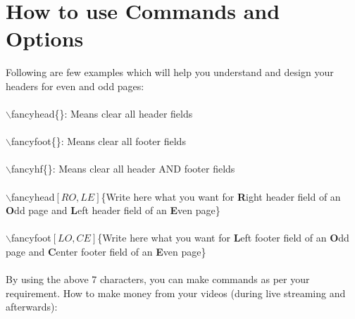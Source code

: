 \documentclass[]{book}
\begin{document}
\section{How to use Commands and Options}
Following are few examples which will help you understand and design your headers for even and odd pages:\\\\
$\backslash$fancyhead\{\}: Means clear all header fields\\\\
$\backslash$fancyfoot\{\}: Means clear all footer fields\\\\
$\backslash$fancyhf\{\}: Means clear all header AND footer fields\\\\
$\backslash$fancyhead$[RO,LE]$\{Write here what you want for \textbf{R}ight header field of an \textbf{O}dd page and \textbf{L}eft header field of an \textbf{E}ven page\}\\\\
$\backslash$fancyfoot$[LO,CE]$\{Write here what you want for \textbf{L}eft footer field of an \textbf{O}dd page and \textbf{C}enter footer field of an \textbf{E}ven page\}\\\\
By using the above 7 characters, you can make commands as per your requirement. 
How to make money from your videos (during live streaming and afterwards):
\end{document}
